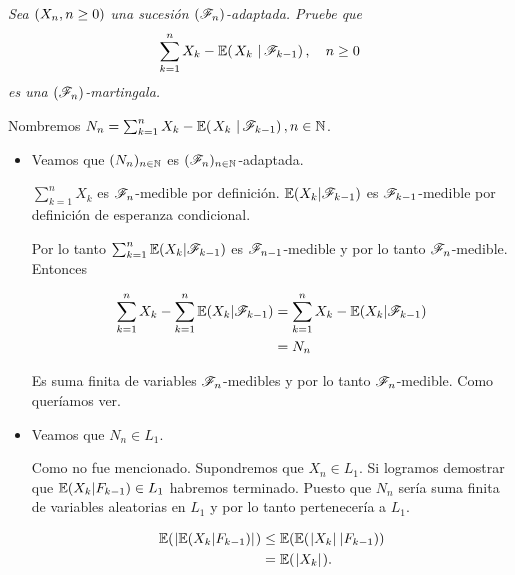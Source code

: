 \emph{
    Sea $\left( X_n,n\geq 0\right) $ una sucesi\'on $\left( \mathscr{F}_n\right) $-adaptada. Pruebe que
    \begin{align}
        \sum_{k=1}^n X_k-\espc{X_k}{\F_{k-1}}, \quad n\geq 0
    \end{align}
    es una $\left( \mathscr{F}_n\right) $-martingala.
}

\afterstatement\par\null

Nombremos $N_n = \sum_{k=1}^n X_k-\espc{X_k}{\F_{k-1}}, n \in \N$.\par\null

\begin{itemize}
	\item 
        Veamos que $(N_n)_{n \in \mathbb{N}}$ es $(\mathscr{F}_n)_{n \in \mathbb{N}}$-adaptada.\par\null
    
        $\sum_{k = 1}^n X_k$ es $\mathscr{F}_n$-medible por definición. $\mathbb{E}(X_k | \mathscr{F}_{k-1})$ es $\mathscr{F}_{k-1}$-medible por definición
        de esperanza condicional. \par\null
        
        Por lo tanto $\sum_{k = 1}^n \mathbb{E}(X_k | \mathscr{F}_{k-1})$ es $\mathscr{F}_{n-1}$-medible y por lo tanto
        $\mathscr{F}_n$-medible. Entonces
        
        \begin{align}
            \sum_{k = 1}^n X_k - \sum_{k = 1}^n \mathbb{E}(X_k | \mathscr{F}_{k-1}) &=  \sum_{k = 1}^n X_k - \mathbb{E}(X_k | \mathscr{F}_{k-1})    \\
                                                                    &=  N_n   
        \end{align}\par\null
    
        Es suma finita de variables $\mathscr{F}_n$-medibles y por lo tanto $\mathscr{F}_n$-medible. Como queríamos ver.\par\null
        
    \item
        Veamos que $N_n \in L_1$.\par\null
        
        Como no fue mencionado. Supondremos que $X_n \in L_1$. Si logramos demostrar que $\mathbb{E}(X_k | F_{k-1}) \in L_1$ habremos terminado.
        Puesto que $N_n$ sería suma finita de variables aleatorias en $L_1$ y por lo tanto pertenecería a $L_1$.\par\null
        
        \begin{align}
            \mathbb{E}(\hspace{.25mm}\left|\mathbb{E}(X_k | F_{k-1})\right|\hspace{.25mm})     &\leq   \mathbb{E}(\mathbb{E}(\hspace{.25mm}\left|X_k\right|\hspace{.25mm} | F_{k-1})) \\
                                            &=      \mathbb{E}(\hspace{.25mm}\left|X_k\right|\hspace{.25mm}). 
        \end{align}
        

\end{itemize}
